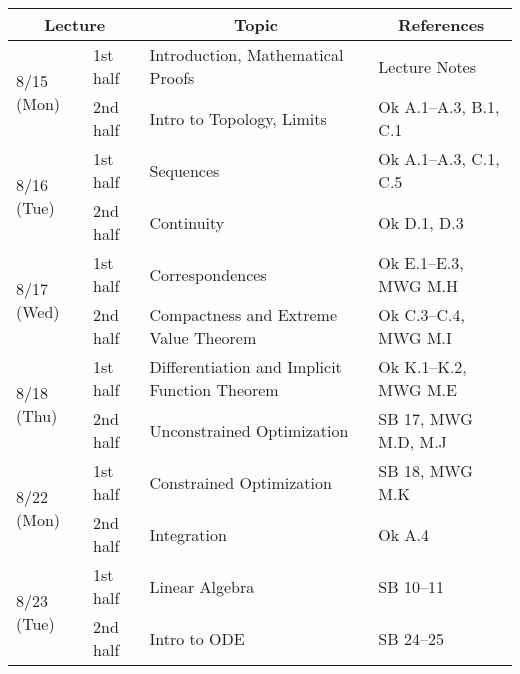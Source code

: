 \documentclass[11pt]{article}
\begin{document}
\begin{tabularx}{\columnwidth}{llll}
  \toprule
  \multicolumn{2}{c}{Lecture}
  &
  \multicolumn{1}{c}{Topic}
  &
  \multicolumn{1}{c}{References}
                                                                                                                 \\\midrule
  \multirow{2}{*}{8/15 (Mon)} & 1st half & Introduction, Mathematical Proofs             & Lecture Notes         \\
                              & 2nd half & Intro to Topology, Limits                     & Ok A.1--A.3, B.1, C.1 \\ [6pt]
  \multirow{2}{*}{8/16 (Tue)} & 1st half & Sequences                                     & Ok A.1--A.3, C.1, C.5 \\
                              & 2nd half & Continuity                                    & Ok D.1, D.3           \\ [6pt]
  \multirow{2}{*}{8/17 (Wed)} & 1st half & Correspondences                               & Ok E.1--E.3, MWG M.H  \\
                              & 2nd half & Compactness and Extreme Value Theorem         & Ok C.3--C.4, MWG M.I  \\ [6pt]
  \multirow{2}{*}{8/18 (Thu)} & 1st half & Differentiation and Implicit Function Theorem & Ok K.1--K.2, MWG M.E  \\
                              & 2nd half & Unconstrained Optimization                    & SB 17, MWG M.D, M.J   \\ [6pt]
  \multirow{2}{*}{8/22 (Mon)} & 1st half & Constrained Optimization                      & SB 18, MWG M.K        \\
                              & 2nd half & Integration                                   & Ok A.4                \\ [6pt]
  \multirow{2}{*}{8/23 (Tue)} & 1st half & Linear Algebra                                & SB 10--11             \\
                              & 2nd half & Intro to ODE                                  & SB 24--25             \\
  \bottomrule
\end{tabularx}


\end{document}
